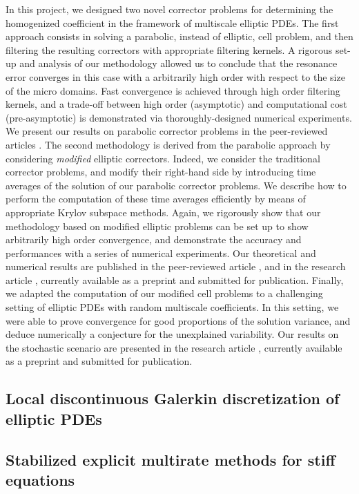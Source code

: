 \documentclass[10pt]{article}
\begin{document}
In this project, we designed two novel corrector problems for determining the homogenized coefficient in the framework of multiscale elliptic PDEs. The first approach consists in solving a parabolic, instead of elliptic, cell problem, and then filtering the resulting correctors with appropriate filtering kernels. A rigorous set-up and analysis of our methodology allowed us to conclude that the resonance error converges in this case with a arbitrarily high order with respect to the size of the micro domains. Fast convergence is achieved through high order filtering kernels, and a trade-off between high order (asymptotic) and computational cost (pre-asymptotic) is demonstrated via thoroughly-designed numerical experiments. We present our results on parabolic corrector problems in the peer-reviewed articles \cite{AAP19,AAP21}. The second methodology is derived from the parabolic approach by considering \textit{modified} elliptic correctors. Indeed, we consider the traditional corrector problems, and modify their right-hand side by introducing time averages of the solution of our parabolic corrector problems. We describe how to perform the computation of these time averages efficiently by means of appropriate Krylov subspace methods. Again, we rigorously show that our methodology based on modified elliptic problems can be set up to show arbitrarily high order convergence, and demonstrate the accuracy and performances with a series of numerical experiments. Our theoretical and numerical results are published in the peer-reviewed article \cite{AAP19}, and in the research article \cite{AAP20}, currently available as a preprint and submitted for publication. Finally, we adapted the computation of our modified cell problems to a challenging setting of elliptic PDEs with random multiscale coefficients. In this setting, we were able to prove convergence for good proportions of the solution variance, and deduce numerically a conjecture for the unexplained variability. Our results on the stochastic scenario are presented in the research article \cite{AAP20b}, currently available as a preprint and submitted for publication.

\subsection{Local discontinuous Galerkin discretization of elliptic PDEs}\label{sec:Rosilho_1}

\subsection{Stabilized explicit multirate methods for stiff equations}\label{sec:Rosilho_2}
\end{document}
